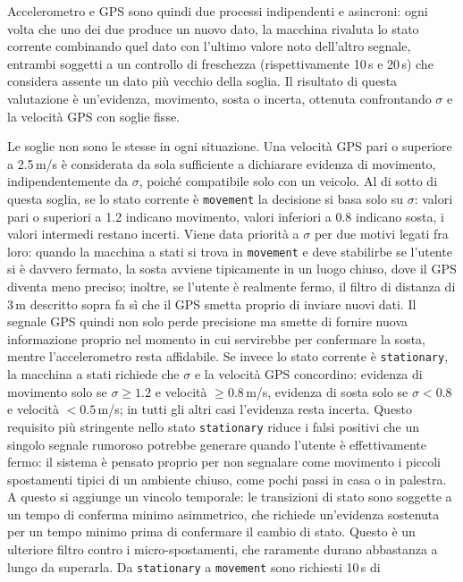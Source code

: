 \documentclass[conference]{IEEEtran}
\begin{document}
Accelerometro e GPS sono quindi due processi indipendenti e asincroni:
ogni volta che uno dei due produce un nuovo dato, la macchina rivaluta
lo stato corrente combinando quel dato con l'ultimo valore noto
dell'altro segnale, entrambi soggetti a un controllo di freschezza
(rispettivamente 10\,s e 20\,s) che considera assente un dato più
vecchio della soglia. Il risultato di questa valutazione è
un'evidenza, movimento, sosta o incerta, ottenuta confrontando
$\sigma$ e la velocità GPS con soglie fisse.

Le soglie non sono le stesse in ogni situazione. Una velocità GPS pari
o superiore a 2.5\,m/s è considerata da sola sufficiente a dichiarare
evidenza di movimento, indipendentemente da $\sigma$, poiché
compatibile solo con un veicolo. Al di sotto di questa soglia, se lo
stato corrente è \texttt{movement} la decisione si basa solo su
$\sigma$: valori pari o superiori a 1.2 indicano movimento, valori
inferiori a 0.8 indicano sosta, i valori intermedi restano incerti.
Viene data priorità a $\sigma$ per due motivi legati fra loro: quando
la macchina a stati si trova in \texttt{movement} e deve stabilirbe se l'utente
si è davvero fermato, la sosta avviene tipicamente in un luogo chiuso,
dove il GPS diventa meno preciso; inoltre, se l'utente è realmente
fermo, il filtro di distanza di 3\,m descritto sopra fa sì che il GPS
smetta proprio di inviare nuovi dati.
Il segnale GPS quindi non solo perde precisione ma smette di
fornire nuova informazione proprio nel momento in cui servirebbe per
confermare la sosta, mentre l'accelerometro resta affidabile. Se
invece lo stato corrente è \texttt{stationary}, la
macchina a stati richiede che $\sigma$ e la velocità GPS concordino: evidenza
di movimento solo se $\sigma \geq 1.2$ e velocità $\geq 0.8$\,m/s,
evidenza di sosta solo se $\sigma < 0.8$ e velocità $< 0.5$\,m/s; in
tutti gli altri casi l'evidenza resta incerta. Questo requisito più
stringente nello stato \texttt{stationary} riduce i falsi positivi che
un singolo segnale rumoroso potrebbe generare quando l'utente è
effettivamente fermo: il sistema è pensato proprio per non segnalare
come movimento i piccoli spostamenti tipici di un ambiente chiuso,
come pochi passi in casa o in palestra.
A questo si aggiunge un vincolo temporale: le transizioni di stato
sono soggette a un tempo di conferma minimo asimmetrico, che richiede
un'evidenza sostenuta per un tempo minimo prima di confermare il
cambio di stato.
Questo è un ulteriore filtro contro i micro-spostamenti, che
raramente durano abbastanza a lungo da superarla. Da
\texttt{stationary} a \texttt{movement} sono richiesti 10\,s di
\end{document}
